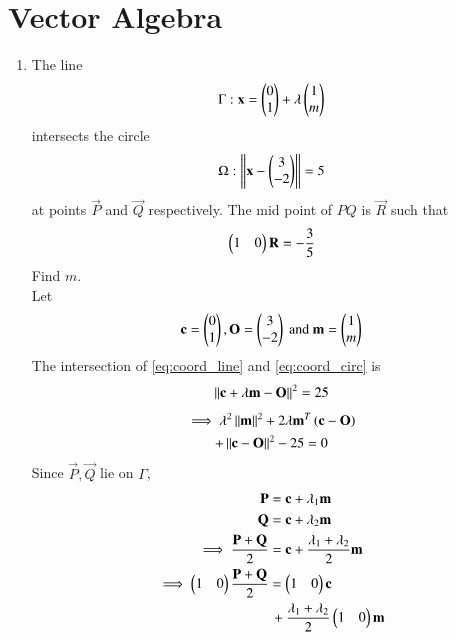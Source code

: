 \documentclass[journal,12pt,twocolumn]{IEEEtran}
\renewcommand\thesection{\arabic{section}}
\begin{document}
\section{Vector Algebra}
\begin{enumerate}[label=\thesection.\arabic*
,ref=\thesection.\theenumi]

\item The line 
\begin{align}
\Gamma: \mathbf{x} = \begin{pmatrix}0 \\ 1\end{pmatrix} + \lambda \begin{pmatrix}1 \\ m\end{pmatrix}
\label{eq:coord_line}
\end{align}
intersects the circle
\begin{align}
\Omega: \left\Vert\mathbf{x}-\begin{pmatrix}3 \\ -2\end{pmatrix}\right\Vert = 5
\label{eq:coord_circ}
\end{align}
at points $\vec{P}$ and $\vec{Q}$ respectively. The mid point of $PQ$ is 
$\vec{R}$ such that
\begin{align}
\begin{pmatrix}1 & 0\end{pmatrix}\mathbf{R} = -\frac{3}{5}
\label{eq:coord_mid}
\end{align}
%
Find $m$.
\\
\solution Let 
\begin{align}
\mathbf{c} = \begin{pmatrix}0 \\ 1\end{pmatrix}, \mathbf{O} = \begin{pmatrix}3 \\ -2\end{pmatrix} \text{ and } \mathbf{m} = 
\begin{pmatrix}1 \\ m\end{pmatrix}
\label{eq:coord_defs}
\end{align}
%
The intersection of  \eqref{eq:coord_line} and \eqref{eq:coord_circ} is 
\begin{align}
\left\Vert\mathbf{c}+\lambda\mathbf{m} -\mathbf{O}\right\Vert^2 = 25
\end{align}
\begin{multline}
\label{eq:coord_quad}
\implies \lambda^2 \left\Vert\mathbf{m}\right\Vert^2+ 2\lambda\mathbf{m}^{T}\left(\mathbf{c} 
-\mathbf{O}\right)
\\
+\left\Vert\mathbf{c} -\mathbf{O}\right\Vert^2-25 = 0
\end{multline}
%
Since $\vec{P}, \vec{Q}$ lie on $\Gamma$,
\begin{align}
\vec{P} &= \vec{c}+\lambda_1\vec{m} 
\\
\vec{Q} &= \vec{c}+\lambda_2\vec{m} 
\\
\implies \frac{\vec{P}+\vec{Q}}{2} &= \vec{c} + 
\frac{\lambda_1+\lambda_2}{2}\vec{m} 
\\
\implies \myvec{1 & 0}\frac{\vec{P}+\vec{Q}}{2} &= \myvec{1 & 0}\vec{c}
\nonumber \\
& \,+ \frac{\lambda_1+\lambda_2}{2}\myvec{1 & 0}\vec{m} 

\end{align}
\end{enumerate}
\end{document}
